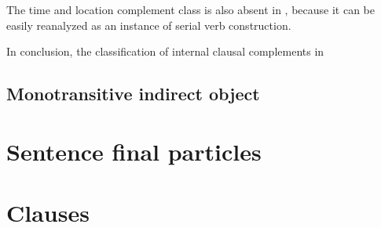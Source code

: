 \documentclass[UTF8, a4paper, oneside, scheme=plain]{ctexart}
\begin{document}
The time and location complement class is also absent in \citet{zhudexigrammar},
because it can be easily reanalyzed as an instance of serial verb construction.

In conclusion, the classification of internal clausal complements in \citet{zhudexigrammar} %

\subsection{Monotransitive indirect object}


\section{Sentence final particles}

\section{Clauses}



\end{document}
